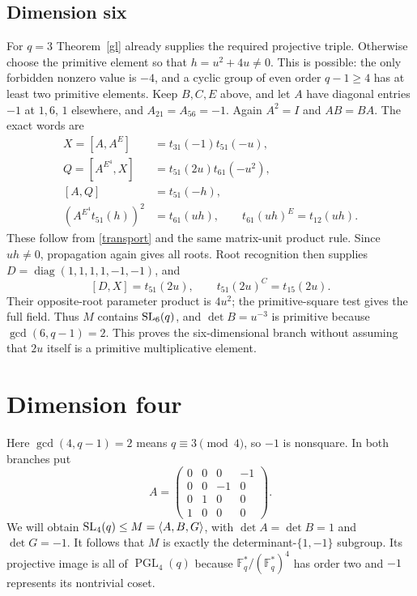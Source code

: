 \documentclass[11pt]{article}
\newcommand{\PGL}{\operatorname{PGL}}\newcommand{\PSL}{\operatorname{PSL}}
\newcommand{\diag}{\operatorname{diag}}\newcommand{\F}{\mathbb F}
\begin{document}
\subsection{Dimension six}
For $q=3$ Theorem~\ref{gl} already supplies the required projective triple.
Otherwise choose the primitive element so that $h=u^2+4u\ne0$.
This is possible: the only forbidden nonzero value is $-4$, and a cyclic
group of even order $q-1\geq4$ has at least two primitive elements.
Keep $B,C,E$ above, and let $A$ have diagonal entries $-1$ at $1,6$,
$1$ elsewhere, and $A_{21}=A_{56}=-1$. Again $A^2=I$ and $AB=BA$.
The exact words are
\begin{align*}
 X=[A,A^E]&=t_{31}(-1)t_{51}(-u),\\
 Q=[A^{E^4},X]&=t_{51}(2u)t_{61}(-u^2),\\
 [A,Q]&=t_{51}(-h),\\
 (A^{E^4}t_{51}(h))^2&=t_{61}(uh),\qquad
 t_{61}(uh)^E=t_{12}(uh).
\end{align*}
These follow from \eqref{transport} and the same matrix-unit product rule.
Since $uh\ne0$, propagation again gives all roots. Root recognition then
supplies $D=\diag(1,1,1,1,-1,-1)$, and
\[
 [D,X]=t_{51}(2u),\qquad t_{51}(2u)^C=t_{15}(2u).
\]
Their opposite-root parameter product is $4u^2$; the primitive-square
test gives the full field. Thus $M$ contains $\operatorname{SL}_6(q)$, and
$\det B=u^{-3}$ is primitive because $\gcd(6,q-1)=2$.
This proves the six-dimensional branch without assuming that $2u$ itself
is a primitive multiplicative element.

\section{Dimension four}
Here $\gcd(4,q-1)=2$ means $q\equiv3\pmod4$, so $-1$ is nonsquare.
In both branches put
\[
 A=\begin{pmatrix}0&0&0&-1\\0&0&-1&0\\0&1&0&0\\1&0&0&0\end{pmatrix}.
\]
We will obtain $\operatorname{SL}_4(q)\leq M=\langle A,B,G\rangle$, with
$\det A=\det B=1$ and $\det G=-1$. It follows that $M$ is exactly the
determinant-$\{1,-1\}$ subgroup. Its projective image is all of
$\PGL_4(q)$ because $\F_q^*/(\F_q^*)^4$ has order two and $-1$ represents
its nontrivial coset.
\end{document}
